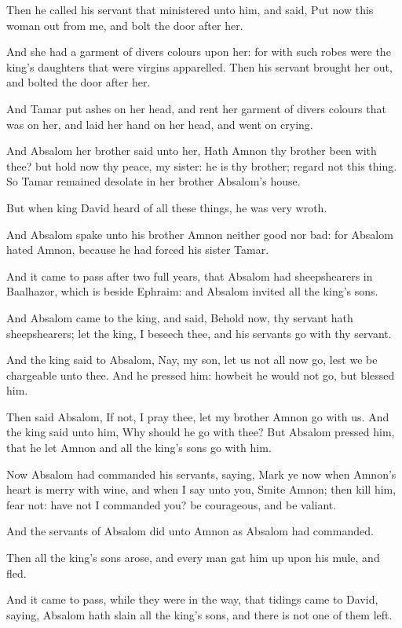 \Verse Then he called his servant that ministered unto him, and said, Put now this woman out from me, and bolt the door after her.

\Verse And she had a garment of divers colours upon her: for with such robes were the king's daughters that were virgins apparelled. Then his servant brought her out, and bolted the door after her.

\Verse And Tamar put ashes on her head, and rent her garment of divers colours that was on her, and laid her hand on her head, and went on crying.

\Verse And Absalom her brother said unto her, Hath Amnon thy brother been with thee? but hold now thy peace, my sister: he is thy brother; regard not this thing. So Tamar remained desolate in her brother Absalom's house.

\Verse But when king David heard of all these things, he was very wroth.

\Verse And Absalom spake unto his brother Amnon neither good nor bad: for Absalom hated Amnon, because he had forced his sister Tamar.

\Verse And it came to pass after two full years, that Absalom had sheepshearers in Baalhazor, which is beside Ephraim: and Absalom invited all the king's sons.

\Verse And Absalom came to the king, and said, Behold now, thy servant hath sheepshearers; let the king, I beseech thee, and his servants go with thy servant.

\Verse And the king said to Absalom, Nay, my son, let us not all now go, lest we be chargeable unto thee. And he pressed him: howbeit he would not go, but blessed him.

\Verse Then said Absalom, If not, I pray thee, let my brother Amnon go with us. And the king said unto him, Why should he go with thee?  \Verse But Absalom pressed him, that he let Amnon and all the king's sons go with him.

\Verse Now Absalom had commanded his servants, saying, Mark ye now when Amnon's heart is merry with wine, and when I say unto you, Smite Amnon; then kill him, fear not: have not I commanded you? be courageous, and be valiant.

\Verse And the servants of Absalom did unto Amnon as Absalom had commanded.

Then all the king's sons arose, and every man gat him up upon his mule, and fled.

\Verse And it came to pass, while they were in the way, that tidings came to David, saying, Absalom hath slain all the king's sons, and there is not one of them left.

